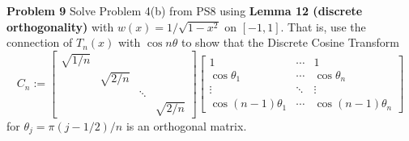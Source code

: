 \documentclass[12pt,a4paper]{article}
\begin{document}
\textbf{Problem 9} Solve Problem 4(b) from PS8 using \textbf{Lemma 12 (discrete orthogonality)} with $w(x) = 1/\sqrt{1-x^2}$ on $[-1,1]$. That is, use the connection of $T_n(x)$ with $\cos n \ensuremath{\theta}$ to show that the Discrete Cosine Transform
\[
C_n := \begin{bmatrix}
\sqrt{1/n} \\
 & \sqrt{2/n} \\
 && \ensuremath{\ddots} \\
 &&& \sqrt{2/n}
 \end{bmatrix}
\begin{bmatrix}
    1 & \ensuremath{\cdots} & 1\\
    \cos \ensuremath{\theta}_1 & \ensuremath{\cdots} & \cos \ensuremath{\theta}_n \\
    \ensuremath{\vdots} & \ensuremath{\ddots} & \ensuremath{\vdots} \\
    \cos (n-1)\ensuremath{\theta}_1 & \ensuremath{\cdots} & \cos (n-1)\ensuremath{\theta}_n
\end{bmatrix}
\]
for $\ensuremath{\theta}_j = \ensuremath{\pi}(j-1/2)/n$ is an orthogonal matrix.
\end{document}
